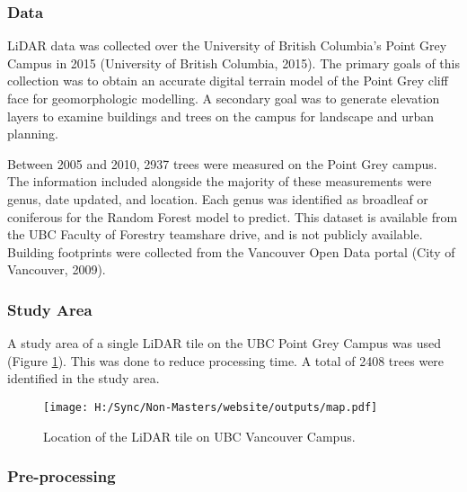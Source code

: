 \documentclass[
]{article}
\begin{document}
\hypertarget{data}{%
\subsubsection{Data}\label{data}}

LiDAR data was collected over the University of British Columbia's Point Grey Campus in 2015 (University of British Columbia, 2015). The primary goals of this collection was to obtain an accurate digital terrain model of the Point Grey cliff face for geomorphologic modelling. A secondary goal was to generate elevation layers to examine buildings and trees on the campus for landscape and urban planning.

Between 2005 and 2010, 2937 trees were measured on the Point Grey campus. The information included alongside the majority of these measurements were genus, date updated, and location. Each genus was identified as broadleaf or coniferous for the Random Forest model to predict. This dataset is available from the UBC Faculty of Forestry teamshare drive, and is not publicly available. Building footprints were collected from the Vancouver Open Data portal (City of Vancouver, 2009).

\hypertarget{study-area}{%
\subsubsection{Study Area}\label{study-area}}

A study area of a single LiDAR tile on the UBC Point Grey Campus was used (Figure \ref{fig:study-area}). This was done to reduce processing time. A total of 2408 trees were identified in the study area.

\begin{figure}
\centering
\texttt{[image: H:/Sync/Non-Masters/website/outputs/map.pdf]}
\caption{\label{fig:unnamed-chunk-3}\label{fig:study-area} Location of the LiDAR tile on UBC Vancouver Campus.}
\end{figure}

\hypertarget{pre-processing}{%
\subsubsection{Pre-processing}\label{pre-processing}}
\end{document}
